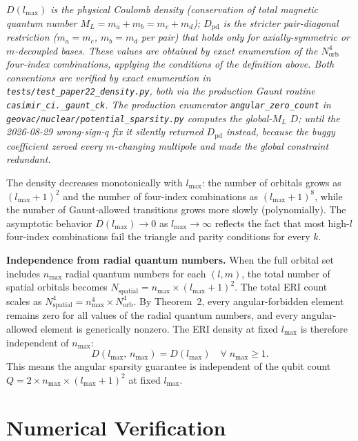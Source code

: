 \documentclass[twocolumn,pra,amsmath,amssymb,superscriptaddress]{revtex4-2}
\begin{document}
\textit{$D(l_{\max})$ is the physical Coulomb density (conservation
of total magnetic quantum number $M_L = m_a + m_b = m_c + m_d$);
$D_{\mathrm{pd}}$ is the stricter pair-diagonal restriction
($m_a = m_c$, $m_b = m_d$ per pair) that holds only for
axially-symmetric or $m$-decoupled bases.  These values are obtained
by exact enumeration of the $N_{\mathrm{orb}}^4$ four-index
combinations, applying the conditions of the definition above.  Both
conventions are verified by exact enumeration in
\texttt{tests/test\_paper22\_density.py}, both via the production Gaunt
routine \texttt{casimir\_ci.\_gaunt\_ck}.  The production enumerator
\texttt{angular\_zero\_count} in
\texttt{geovac/nuclear/potential\_sparsity.py} computes the global-$M_L$
$D$; until the 2026-08-29 wrong-sign-$q$ fix it silently returned
$D_{\mathrm{pd}}$ instead, because the buggy coefficient zeroed every
$m$-changing multipole and made the global constraint redundant.}

The density decreases monotonically with $l_{\max}$: the number of
orbitals grows as $(l_{\max}+1)^2$ and the number of four-index
combinations as $(l_{\max}+1)^8$, while the number of Gaunt-allowed
transitions grows more slowly (polynomially).  The asymptotic
behavior $D(l_{\max}) \to 0$ as $l_{\max} \to \infty$ reflects the
fact that most high-$l$ four-index combinations fail the triangle
and parity conditions for every $k$.

\medskip
\noindent\textbf{Independence from radial quantum numbers.}
When the full orbital set includes $n_{\max}$ radial quantum numbers
for each $(l, m)$, the total number of spatial orbitals becomes
$N_{\mathrm{spatial}} = n_{\max} \times (l_{\max}+1)^2$.  The total
ERI count scales as $N_{\mathrm{spatial}}^4 = n_{\max}^4 \times
N_{\mathrm{orb}}^4$.  By Theorem~2, every angular-forbidden element
remains zero for all values of the radial quantum numbers, and every
angular-allowed element is generically nonzero.  The ERI density at
fixed $l_{\max}$ is therefore independent of $n_{\max}$:
\begin{equation}
  D(l_{\max},\, n_{\max}) = D(l_{\max}) \quad \forall\; n_{\max} \geq 1.
  \label{eq:nmax_independence}
\end{equation}
This means the angular sparsity guarantee is independent of the
qubit count $Q = 2 \times n_{\max} \times (l_{\max}+1)^2$ at fixed
$l_{\max}$.

\section{Numerical Verification}
\label{sec:verification}
\end{document}
